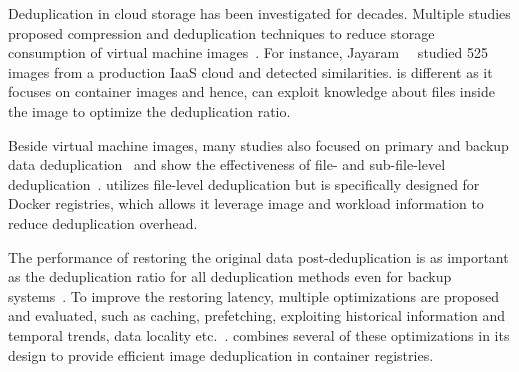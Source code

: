 %

Deduplication in cloud storage has been investigated for decades.
%
Multiple studies proposed compression and deduplication techniques to reduce storage
consumption of virtual machine
images~\cite{zhou2013characterizing,srinivasan2012idedup,jin2009effectiveness}.
%
For instance, Jayaram~\etal~\cite{jayaram2011empirical} studied 525 images
from a production IaaS cloud and detected similarities. 
 \sysname is different as it focuses on container images and hence, can exploit
 knowledge about files inside the image to optimize the deduplication ratio.
 
Beside virtual machine images, many studies also focused on primary and backup data
deduplication~\cite{tarasov2014dmdedup,muthitacharoen2001low,lu2012insights,2009-sparse_indexing_inline_dedup_using_sampling-fast,2013-charact_increment_changes_data_protect-atc,wallace2012characteristics,zhu2008avoiding}
and show the effectiveness of file- and sub-file-level
deduplication~\cite{2012-hpc_practical_dedup_study-sc,msst16dedup-study}.
%
\sysname utilizes file-level deduplication but is specifically designed for Docker registries,
which allows it leverage image and workload information to reduce deduplication overhead.
%


The performance of restoring the original data post-deduplication is as important as the deduplication ratio for all
deduplication methods even for backup systems~\cite{lillibridge2013improving}.
%
To improve the restoring latency, multiple optimizations are proposed and evaluated, such as caching, prefetching, exploiting
historical information and temporal trends, data locality etc.~\cite{fu2014accelerating,fu2015design,fu2011aa}. 
%
\sysname combines several of these optimizations in its design to provide efficient
image deduplication in container registries.
%

